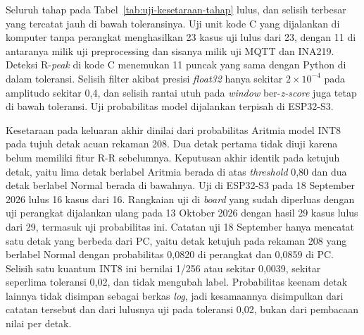 Seluruh tahap pada Tabel~\ref{tab:uji-kesetaraan-tahap} lulus, dan selisih terbesar yang tercatat jauh di bawah toleransinya. Uji unit kode C yang dijalankan di komputer tanpa perangkat menghasilkan 23 kasus uji lulus dari 23, dengan 11 di antaranya milik uji preprocessing dan sisanya milik uji MQTT dan INA219. Deteksi R-\textit{peak} di kode C menemukan 11 puncak yang sama dengan Python di dalam toleransi. Selisih filter akibat presisi \textit{float32} hanya sekitar $2 \times 10^{-4}$ pada amplitudo sekitar 0,4, dan selisih rantai utuh pada \textit{window} ber-\textit{z-score} juga tetap di bawah toleransi. Uji probabilitas model dijalankan terpisah di ESP32-S3.

Kesetaraan pada keluaran akhir dinilai dari probabilitas Aritmia model INT8 pada tujuh detak acuan rekaman 208. Dua detak pertama tidak diuji karena belum memiliki fitur R-R sebelumnya. Keputusan akhir identik pada ketujuh detak, yaitu lima detak berlabel Aritmia berada di atas \textit{threshold} 0,80 dan dua detak berlabel Normal berada di bawahnya. Uji di ESP32-S3 pada 18 September 2026 lulus 16 kasus dari 16. Rangkaian uji di \textit{board} yang sudah diperluas dengan uji perangkat dijalankan ulang pada 13 Oktober 2026 dengan hasil 29 kasus lulus dari 29, termasuk uji probabilitas ini. Catatan uji 18 September hanya mencatat satu detak yang berbeda dari PC, yaitu detak ketujuh pada rekaman 208 yang berlabel Normal dengan probabilitas 0,0820 di perangkat dan 0,0859 di PC. Selisih satu kuantum INT8 ini bernilai 1/256 atau sekitar 0,0039, sekitar seperlima toleransi 0,02, dan tidak mengubah label. Probabilitas keenam detak lainnya tidak disimpan sebagai berkas \textit{log}, jadi kesamaannya disimpulkan dari catatan tersebut dan dari lulusnya uji pada toleransi 0,02, bukan dari pembacaan nilai per detak.

